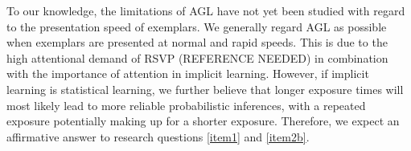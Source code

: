 To our knowledge, the limitations of AGL have not yet been studied with regard to the presentation speed of exemplars. We generally regard AGL as possible when exemplars are presented at normal and rapid speeds. This is due to the high attentional demand of RSVP (REFERENCE NEEDED) in combination with the importance of attention in implicit learning. However, if implicit learning is statistical learning, we further believe that longer exposure times will most likely lead to more reliable probabilistic inferences, with a repeated exposure potentially making up for a shorter exposure. Therefore, we expect an affirmative answer to research questions \ref{item1} and \ref{item2b}. 


